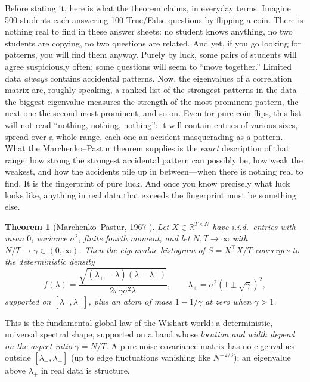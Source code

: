 \documentclass[11pt]{article}
\newtheorem{theorem}{Theorem}
\newcommand{\lplus}{\lambda_{+}}
\newcommand{\lminus}{\lambda_{-}}
\begin{document}
Before stating it, here is what the theorem claims, in everyday terms.
Imagine 500 students each answering 100 True/False questions by
flipping a coin. There is nothing real to find in these answer sheets:
no student knows anything, no two students are copying, no two
questions are related. And yet, if you go looking for patterns, you
will find them anyway. Purely by luck, some pairs of students will
agree suspiciously often; some questions will seem to ``move
together.'' Limited data \emph{always} contains accidental patterns.
Now, the eigenvalues of a correlation matrix are, roughly speaking, a
ranked list of the strongest patterns in the data---the biggest
eigenvalue measures the strength of the most prominent pattern, the
next one the second most prominent, and so on. Even for pure coin
flips, this list will not read ``nothing, nothing, nothing'': it will
contain entries of various sizes, spread over a whole range, each one
an accident masquerading as a pattern. What the Marchenko--Pastur
theorem supplies is the \emph{exact} description of that range: how
strong the strongest accidental pattern can possibly be, how weak the
weakest, and how the accidents pile up in between---when there is
nothing real to find. It is the fingerprint of pure luck. And once you
know precisely what luck looks like, anything in real data that exceeds
the fingerprint must be something else.

\begin{theorem}[Marchenko--Pastur, 1967 \cite{marchenko1967}]
\label{thm:mp}
Let $X\in\mathbb R^{T\times N}$ have i.i.d.\ entries with mean $0$,
variance $\sigma^{2}$, finite fourth moment, and let $N,T\to\infty$ with
$N/T\to\gamma\in(0,\infty)$. Then the eigenvalue histogram of
$S=X^{\top}X/T$ converges to the deterministic density
\begin{equation}
f(\lambda)=\frac{\sqrt{(\lplus-\lambda)(\lambda-\lminus)}}
{2\pi\gamma\sigma^{2}\lambda},
\qquad
\lambda_{\pm}=\sigma^{2}(1\pm\sqrt\gamma)^{2},
\label{eq:mpdensity}
\end{equation}
supported on $[\lminus,\lplus]$, plus an atom of mass $1-1/\gamma$ at zero
when $\gamma>1$.
\end{theorem}

This is the fundamental global law of the Wishart world: a deterministic,
universal spectral shape, supported on a band whose \emph{location and
width depend on the aspect ratio} $\gamma=N/T$. A pure-noise covariance matrix
has no eigenvalues outside $[\lminus,\lplus]$ (up to edge fluctuations
vanishing like $N^{-2/3}$); an eigenvalue above $\lplus$ in real data is
structure.
\end{document}
